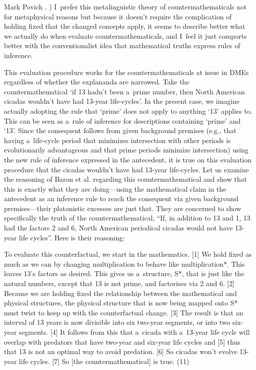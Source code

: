 \begin{artengenv}{Mark Povich}
{%
\parencite[][p.303]{bennett_philosophical_2003}.%
) I~prefer this metalinguistic theory of countermathematicals not for metaphysical reasons but because it doesn't require the complication of holding fixed that the changed concepts apply, it seems to describe better what we actually do when evaluate countermathematicals, and I~feel it just comports better with the conventionalist idea that mathematical truths express rules of inference.}

This evaluation procedure works for the countermathematicals at issue in DMEs regardless of whether the explananda are narrowed. Take the countermathematical ‘if 13 hadn't been a~prime number, then North American cicadas wouldn't have had 13-year life-cycles'. In the present case, we imagine actually adopting the rule that ‘prime' does not apply to anything ‘13' applies to. This can be seen as a~rule of inference for descriptions containing ‘prime' and ‘13'. Since the consequent follows from given background premises (e.g., that having a~life-cycle period that minimizes intersection with other periods is evolutionarily advantageous and that prime periods minimize intersection) using the new rule of inference expressed in the antecedent, it is true on this evaluation procedure that the cicadas wouldn't have had 13-year life-cycles. Let us examine the reasoning of Baron et al.
\parencite*[][p.11]{balaguer_mathematical_2017} %
 regarding this countermathematical and show that this is exactly what they are doing---using the mathematical claim in the antecedent as an inference rule to reach the consequent via given background premises---their platonistic excesses are just that. They are concerned to show specifically the truth of the countermathematical, ``If, in addition to 13 and 1, 13 had the factors 2 and 6, North American periodical cicadas would not have 13-year life cycles''. Here is their reasoning:

To evaluate this counterfactual, we start in the mathematics. [1] We hold fixed as much as we can by changing multiplication to behave like multiplication*. This leaves 13's factors as desired. This gives us a~structure, S*, that is just like the natural numbers, except that 13 is not prime, and factorises via 2 and 6. [2] Because we are holding fixed the relationship between the mathematical and physical structures, the physical structure that is now being mapped onto S* must twist to keep up with the counterfactual change. [3] The result is that an interval of 13 years is now divisible into six two-year segments, or into two six-year segments. [4] It follows from this that a~cicada with a~13-year life cycle will overlap with predators that have two-year and six-year life cycles and [5] thus that 13 is not an optimal way to avoid predation. [6] So cicadas won't evolve 13-year life cycles. [7] So [the countermathematical] is true. (11)


\end{artengenv}
